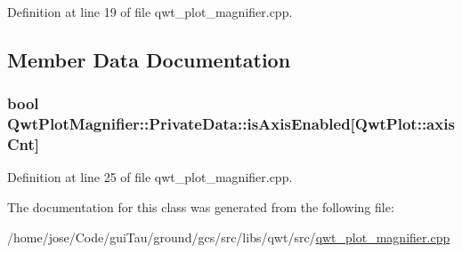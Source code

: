 Definition at line 19 of file qwt\-\_\-plot\-\_\-magnifier.\-cpp.



\subsection{Member Data Documentation}
\hypertarget{class_qwt_plot_magnifier_1_1_private_data_aa201c20677b80b96f587977b67f2014e}{
\subsubsection[{is\-Axis\-Enabled}]{\setlength{\rightskip}{0pt plus 5cm}bool Qwt\-Plot\-Magnifier\-::\-Private\-Data\-::is\-Axis\-Enabled\mbox{[}{\bf Qwt\-Plot\-::axis\-Cnt}\mbox{]}}}\label{class_qwt_plot_magnifier_1_1_private_data_aa201c20677b80b96f587977b67f2014e}


Definition at line 25 of file qwt\-\_\-plot\-\_\-magnifier.\-cpp.



The documentation for this class was generated from the following file\-:\begin{DoxyCompactItemize}
\item 
/home/jose/\-Code/gui\-Tau/ground/gcs/src/libs/qwt/src/\hyperlink{qwt__plot__magnifier_8cpp}{qwt\-\_\-plot\-\_\-magnifier.\-cpp}\end{DoxyCompactItemize}
